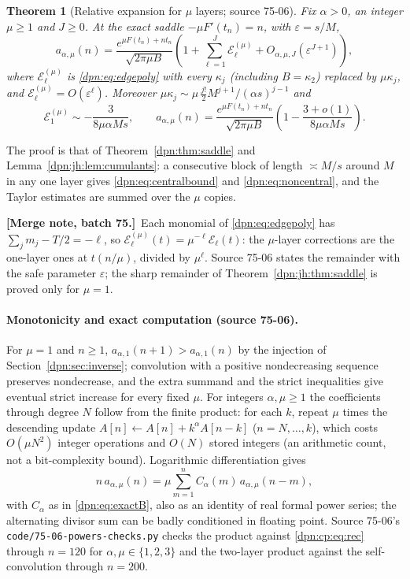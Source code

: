\documentclass[11pt]{article}
\numberwithin{equation}{section}
\newtheorem{theorem}{Theorem}[section]
\theoremstyle{definition}\newtheorem{definition}[theorem]{Definition}
\theoremstyle{remark}\newtheorem{remark}[theorem]{Remark}
\newcommand{\eps}{\varepsilon}
\newcommand{\src}[1]{\textup{(source #1)}}
\newcommand{\file}[1]{\nolinkurl{#1}}
\newcommand{\mergenoteb}[1]{\par\smallskip\noindent\textbf{[Merge note, batch 75.]}\ #1\par\smallskip}
\begin{document}
\begin{theorem}[Relative expansion for $\mu$ layers; source 75-06]\label{dpn:cp:thm:saddle}
Fix $\alpha>0$, an integer $\mu\ge1$ and $J\ge0$.  At the exact saddle
$-\mu F'(t_n)=n$, with $\eps=s/M$,
\begin{equation}\label{dpn:cp:eq:rel}
 a_{\alpha,\mu}(n)=\frac{e^{\mu F(t_n)+nt_n}}{\sqrt{2\pi\mu B}}
 \left(1+\sum_{\ell=1}^J\mathcal E^{(\mu)}_\ell+O_{\alpha,\mu,J}(\eps^{J+1})\right),
\end{equation}
where $\mathcal E^{(\mu)}_\ell$ is \eqref{dpn:eq:edgepoly} with every $\kappa_j$
(including $B=\kappa_2$) replaced by $\mu\kappa_j$, and
$\mathcal E^{(\mu)}_\ell=O(\eps^\ell)$.  Moreover
$\mu\kappa_j\sim\mu\,\tfrac{j!}2M^{j+1}/(\alpha s)^{j-1}$ and
\begin{equation}\label{dpn:cp:eq:E1}
 \mathcal E^{(\mu)}_1\sim-\frac{3}{8\mu\alpha Ms},\qquad
 a_{\alpha,\mu}(n)=\frac{e^{\mu F(t_n)+nt_n}}{\sqrt{2\pi\mu B}}
 \left(1-\frac{3+o(1)}{8\mu\alpha Ms}\right).
\end{equation}
\end{theorem}
The proof is that of Theorem~\ref{dpn:thm:saddle} and
Lemma~\ref{dpn:jh:lem:cumulants}: a consecutive block of length $\asymp M/s$
around $M$ in any one layer gives \eqref{dpn:eq:centralbound} and
\eqref{dpn:eq:noncentral}, and the Taylor estimates are summed over the $\mu$
copies.
\mergenoteb{Each monomial of \eqref{dpn:eq:edgepoly} has
$\sum_jm_j-T/2=-\ell$, so $\mathcal E^{(\mu)}_\ell(t)=\mu^{-\ell}\mathcal
E_\ell(t)$: the $\mu$-layer corrections are the one-layer ones at $t(n/\mu)$,
divided by $\mu^\ell$.  Source 75-06 states the remainder with the safe
parameter $\eps$; the sharp remainder of Theorem~\ref{dpn:jh:thm:saddle} is
proved only for $\mu=1$.}

\paragraph{Monotonicity and exact computation \src{75-06}.}
For $\mu=1$ and $n\ge1$, $a_{\alpha,1}(n+1)>a_{\alpha,1}(n)$ by the injection
of Section~\ref{dpn:sec:inverse}; convolution with a positive nondecreasing
sequence preserves nondecrease, and the extra summand and the strict
inequalities give eventual strict increase for every fixed $\mu$.  For
integers $\alpha,\mu\ge1$ the coefficients through degree $N$ follow from the
finite product: for each $k$, repeat $\mu$ times the descending update
$A[n]\leftarrow A[n]+k^\alpha A[n-k]$ ($n=N,\dots,k$), which costs
$O(\mu N^2)$ integer operations and $O(N)$ stored integers (an arithmetic
count, not a bit-complexity bound).  Logarithmic differentiation gives
\begin{equation}\label{dpn:cp:eq:rec}
 n\,a_{\alpha,\mu}(n)=\mu\sum_{m=1}^nC_\alpha(m)\,a_{\alpha,\mu}(n-m),
\end{equation}
with $C_\alpha$ as in \eqref{dpn:eq:exactB}, also as an identity of real formal
power series; the alternating divisor sum can be badly conditioned in floating
point.  Source 75-06's \file{code/75-06-powers-checks.py} checks the product
against \eqref{dpn:cp:eq:rec} through $n=120$ for $\alpha,\mu\in\{1,2,3\}$ and
the two-layer product against the self-convolution through $n=200$.
\end{document}
